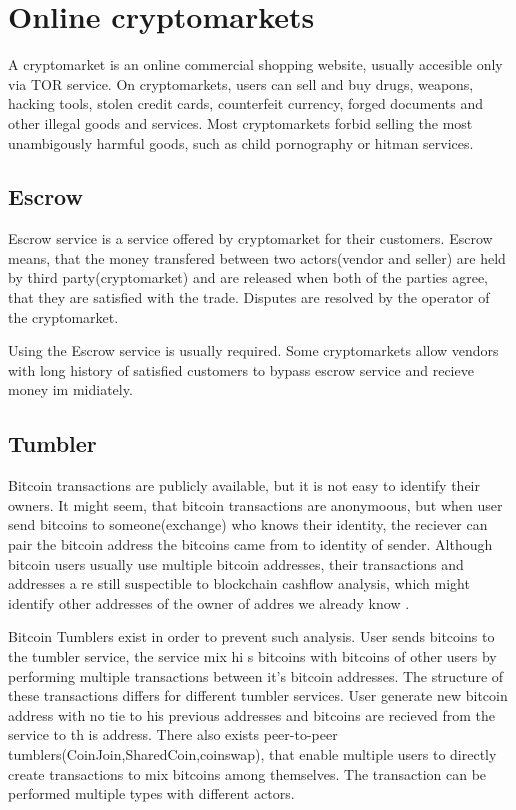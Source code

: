 \documentclass[
  digital, %
  table,   %
  lof,     %
  lot,     %
  oneside
]{fithesis3}
\begin{document}
\section{Online cryptomarkets}
A cryptomarket is an online commercial shopping website, usually accesible only via TOR service.
On cryptomarkets, users can sell and buy  drugs, weapons, hacking tools, stolen credit cards,
counterfeit currency, forged documents and other illegal goods and services.
Most cryptomarkets forbid selling the most unambigously harmful goods, such as
 child pornography or hitman services.

\subsection{Escrow}
Escrow service is a service offered by cryptomarket for their customers.
Escrow means, that the money transfered between two actors(vendor and seller) are held by third party(cryptomarket)
 and are released when both of the parties agree, that they are satisfied with the trade.
 Disputes are resolved by the operator of the cryptomarket.

 Using the Escrow service is usually required.
 Some cryptomarkets allow vendors with long history of satisfied customers to bypass escrow service and recieve money im
midiately.
 
\subsection{Tumbler}

Bitcoin transactions are publicly available, but it is not easy to identify their owners.
It might seem, that bitcoin transactions are anonymoous, but when user send bitcoins to
someone(exchange) who knows their identity, the reciever can pair the bitcoin address the bitcoins came from
to identity of sender. Although bitcoin users usually use multiple bitcoin addresses, their transactions and addresses a
re still 
suspectible to blockchain cashflow analysis, which might identify other addresses of the owner of addres we already know
.

Bitcoin Tumblers exist in order to prevent such analysis. User sends bitcoins to the tumbler service, the service mix hi
s bitcoins
with bitcoins of other users by performing multiple transactions between it's bitcoin addresses.
The structure of these transactions differs for different tumbler services.
User generate new bitcoin address with no tie to his previous addresses and bitcoins are recieved from the service to th
is address.
 There also exists peer-to-peer tumblers(CoinJoin,SharedCoin,coinswap),
that enable multiple users to directly create transactions to mix bitcoins among themselves.
The transaction can be performed multiple types with different actors.
\end{document}
